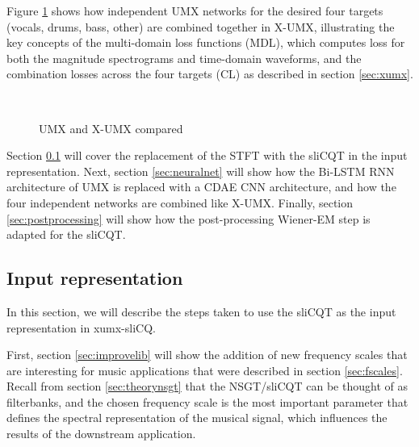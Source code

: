 \documentclass[report.tex]{subfiles}
\begin{document}
Figure \ref{fig:xumxcl} shows how independent UMX networks for the desired four targets (vocals, drums, bass, other) are combined together in X-UMX, illustrating the key concepts of the multi-domain loss functions (MDL), which computes loss for both the magnitude spectrograms and time-domain waveforms, and the combination losses across the four targets (CL) as described in section \ref{sec:xumx}.

\begin{figure}[ht]
	\centering
	\\
	\caption{UMX and X-UMX compared}
	\label{fig:xumxcl}
\end{figure}

Section \ref{sec:inputrepresentation} will cover the replacement of the STFT with the sliCQT in the input representation. Next, section \ref{sec:neuralnet} will show how the Bi-LSTM RNN architecture of UMX is replaced with a CDAE CNN architecture, and how the four independent networks are combined like X-UMX. Finally, section \ref{sec:postprocessing} will show how the post-processing Wiener-EM step is adapted for the sliCQT.

\subsection{Input representation}
\label{sec:inputrepresentation}

In this section, we will describe the steps taken to use the sliCQT as the input representation in xumx-sliCQ.

First, section \ref{sec:improvelib} will show the addition of new frequency scales that are interesting for music applications that were described in section \ref{sec:fscales}. Recall from section \ref{sec:theorynsgt} that the NSGT/sliCQT can be thought of as filterbanks, and the chosen frequency scale is the most important parameter that defines the spectral representation of the musical signal, which influences the results of the downstream application.
\end{document}
